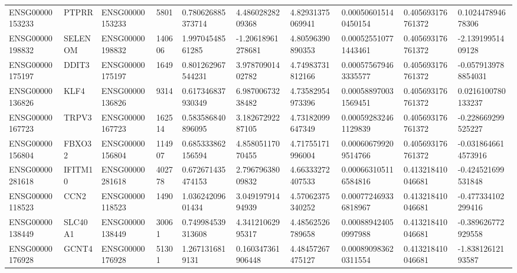 \begin{tabular}{@{}llllllllll@{}}
ENSG00000153233 & PTPRR & ENSG00000153233 & 5801 & 0.780626885373714 & 4.48602828209368 & 4.82931375069941 & 0.000506015140450154 & 0.405693176761372 & 0.102447894678306 \\
ENSG00000198832 & SELENOM & ENSG00000198832 & 140606 & 1.99704548561285 & -1.20618961278681 & 4.80596390890353 & 0.000525510771443461 & 0.405693176761372 & -2.13919951409128 \\
ENSG00000175197 & DDIT3 & ENSG00000175197 & 1649 & 0.801262967544231 & 3.97870901402782 & 4.74983731812166 & 0.000575679463335577 & 0.405693176761372 & -0.0579139788854031 \\
ENSG00000136826 & KLF4 & ENSG00000136826 & 9314 & 0.617346837930349 & 6.98700673238482 & 4.73582954973396 & 0.000588970031569451 & 0.405693176761372 & 0.0216100780133237 \\
ENSG00000167723 & TRPV3 & ENSG00000167723 & 162514 & 0.583586840896095 & 3.18267292287105 & 4.73182099647349 & 0.000592832461129839 & 0.405693176761372 & -0.228669299525227 \\
ENSG00000156804 & FBXO32 & ENSG00000156804 & 114907 & 0.685333862156594 & 4.85805117070455 & 4.71755171996004 & 0.000606799209514766 & 0.405693176761372 & -0.0318646614573916 \\
ENSG00000281618 & IFITM10 & ENSG00000281618 & 402778 & 0.672671435474153 & 2.79679638009832 & 4.66333272407533 & 0.000663105116584816 & 0.413218410046681 & -0.424521699531848 \\
ENSG00000118523 & CCN2 & ENSG00000118523 & 1490 & 1.03624209601434 & 3.04919791494939 & 4.57062375340252 & 0.000772469336818967 & 0.413218410046681 & -0.477334102299416 \\
ENSG00000138449 & SLC40A1 & ENSG00000138449 & 30061 & 0.749984539313608 & 4.34121062995317 & 4.48562526789658 & 0.000889424050997988 & 0.413218410046681 & -0.389626772929558 \\
ENSG00000176928 & GCNT4 & ENSG00000176928 & 51301 & 1.2671316819131 & 0.160347361906448 & 4.48457267475127 & 0.000890983620311554 & 0.413218410046681 & -1.83812612193587 \\
\bottomrule
\end{tabular}
\endgroup
